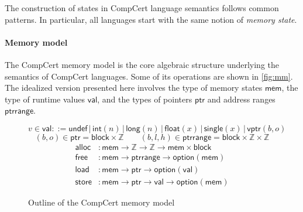 \documentclass[sigplan,screen]{acmart}
\newcommand{\figsize}{\small}
\newcommand{\kw}[1]{\ensuremath{ \mathsf{#1} }}
\begin{document}
The construction of states in CompCert language semantics
follows common patterns.
In particular,
all languages start with
the same notion of \emph{memory state}.


\paragraph{Memory model} \label{sec:sem:mm} %

The CompCert memory model \cite{compcertmm,compcertmmv2}
is the core algebraic structure
underlying the semantics of CompCert languages.
Some of its operations
are shown in \autoref{fig:mm}.
The idealized version presented here
involves
the type of memory states \kw{mem},
the type of runtime values \kw{val}, and
the types of pointers \kw{ptr} and address ranges \kw{ptrrange}.

\begin{figure} %
  \figsize
  \[
    v \in \kw{val} ::=
          \kw{undef} \,|\,
          \kw{int}(n) \,|\,
          \kw{long}(n) \,|\,
          \kw{float}(x) \,|\,
          \kw{single}(x) \,|\,
          \kw{vptr}(b, o)
  \]
  \[
    (b, o) \in \kw{ptr} =
      \kw{block} \times \mathbb{Z}
    \qquad
    (b, l, h) \in \kw{ptrrange} =
      \kw{block} \times \mathbb{Z} \times \mathbb{Z}
  \]
  \begin{align*}
    \kw{alloc} &:
      \kw{mem} \rightarrow \mathbb{Z} \rightarrow \mathbb{Z} \rightarrow
      \kw{mem} \times \kw{block}
    \\
    \kw{free} &:
      \kw{mem} \rightarrow
      \kw{ptrrange} \rightarrow
      \kw{option}(\kw{mem})
    \\
    \kw{load} &:
      \kw{mem} \rightarrow \kw{ptr} \rightarrow \kw{option}(\kw{val})
    \\
    \kw{store} &:
      \kw{mem} \rightarrow \kw{ptr} \rightarrow \kw{val} \rightarrow \kw{option}(\kw{mem})
  \end{align*}
  \caption{Outline of the CompCert memory model}
  \label{fig:mm}
\end{figure}
\end{document}
